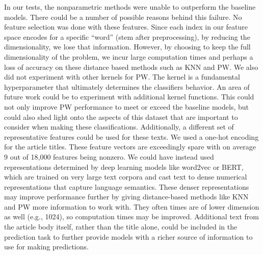 \documentclass[12pt]{article}
\begin{document}
	In our tests, the nonparametric methods were unable to outperform the baseline models. There could be a number of possible reasons behind this failure. No feature selection was done with these features. Since each index in our feature space encodes for a specific ``word'' (stem after preprocessing), by reducing the dimensionality, we lose that information. However, by choosing to keep the full dimensionality of the problem, we incur large computation times and perhaps a loss of accuracy on these distance based methods such as KNN and PW. We also did not experiment with other kernels for PW. The kernel is a fundamental hyperparameter that ultimately determines the classifiers behavior. An area of future work could be to experiment with additional kernel functions. This could not only improve PW performance to meet or exceed the baseline models, but could also shed light onto the aspects of this dataset that are important to consider when making these classifications. Additionally, a different set of representative features could be used for these texts. We used a one-hot encoding for the article titles. These feature vectors are exceedingly spare with on average 9 out of 18,000 features being nonzero. We could have instead used representations determined by deep learning models like word2vec or BERT, which are trained on very large text corpora and cast text to dense numerical representations that capture language semantics. These denser representations may improve performance further by giving distance-based methods like KNN and PW more information to work with. They often times are of lower dimension as well (e.g., 1024), so computation times may be improved. Additional text from the article body itself, rather than the title alone, could be included in the prediction task to further provide models with a richer source of information to use for making predictions.
	
\end{document}
